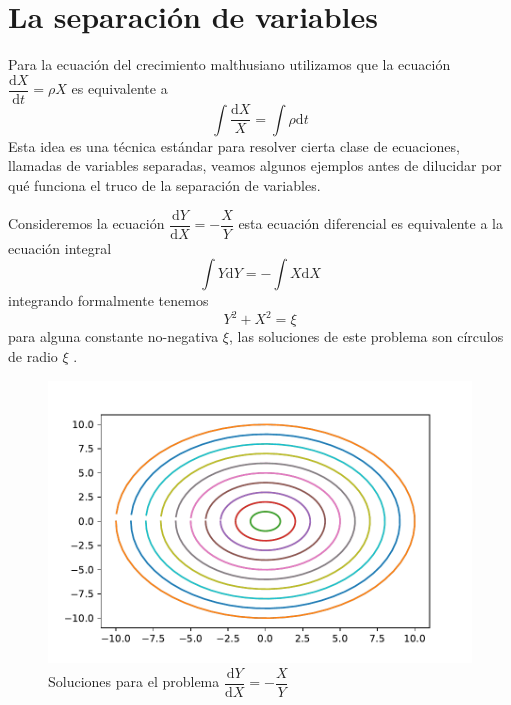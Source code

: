 \section{La separación de variables}

Para la ecuación del crecimiento malthusiano utilizamos que la ecuación $\dfrac{\mathrm{d}X}{\mathrm{d}t}=\rho X$ es equivalente a 
$$\int \dfrac{\mathrm{d}X}{X}=\int \rho\mathrm{d}t$$
Esta idea es una técnica estándar para resolver cierta clase de ecuaciones, llamadas de variables separadas, veamos algunos ejemplos antes de dilucidar por qué funciona el truco de la separación de variables.

\begin{exampleT}
Consideremos la ecuación $\dfrac{\mathrm{d}Y}{\mathrm{d}X}=-\dfrac{X}{Y}$ esta ecuación diferencial es equivalente a la ecuación integral 
$$
\int Y\mathrm{d}Y =-\int X\mathrm{d}X
$$
integrando formalmente tenemos
$$
Y^2+X^2=\xi
$$
para alguna constante no-negativa $\xi$, las soluciones de este problema son círculos de radio $\xi$ .
\begin{figure}[H]
    \centering
    \includegraphics[scale=0.85]{circulos.pdf}
    \caption{Soluciones para el problema $\dfrac{\mathrm{d}Y}{\mathrm{d}X}=-\dfrac{X}{Y}$ }
    \label{fig:circ}
\end{figure}
\end{exampleT}

